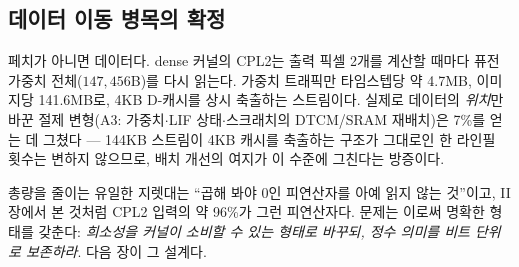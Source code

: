 \subsection{데이터 이동 병목의 확정}\label{sec:datamove}

페치가 아니면 데이터다. dense 커널의 CPL2는 출력 픽셀 2개를 계산할
때마다 퓨전 가중치 전체($147{,}456$B)를 다시 읽는다. 가중치
트래픽만 타임스텝당 약 4.7MB, 이미지당 141.6MB로, 4KB
D-캐시를 상시 축출하는 스트림이다. 실제로 데이터의 \emph{위치}만
바꾼 절제 변형(A3: 가중치$\cdot$LIF 상태$\cdot$스크래치의
DTCM/SRAM 재배치)은 7\%를 얻는 데 그쳤다 --- 144KB 스트림이 4KB
캐시를 축출하는 구조가 그대로인 한 라인필 횟수는 변하지 않으므로,
배치 개선의 여지가 이 수준에 그친다는 방증이다.

총량을 줄이는 유일한 지렛대는 ``곱해 봐야 0인 피연산자를 아예 읽지
않는 것''이고, II장에서 본 것처럼 CPL2 입력의 약 96\%가 그런
피연산자다. 문제는 이로써 명확한 형태를 갖춘다: \emph{희소성을
커널이 소비할 수 있는 형태로 바꾸되, 정수 의미를 비트 단위로
보존하라}. 다음 장이 그 설계다.
